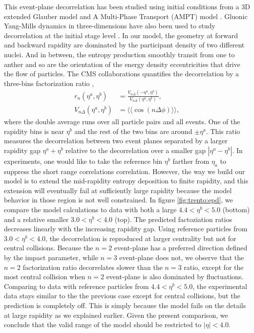 This event-plane decorrelation has been studied using initial conditions from a 3D extended Glauber model \cite{Bozek:2015bna} and A Multi-Phase Transport (AMPT) model \cite{Jia:2014ysa, Xiao:2012uw,Pang:2015zrq}.
Gluonic Yang-Mills dynamics in three-dimensions have also been used to study decorrelation at the initial stage level \cite{Schenke:2016ksl}.
In our model, the geometry at forward and backward rapidity are dominated by the participant density of two different nuclei.
And in between, the entropy production smoothly transit from one to anther and so are the orientation of the energy density eccentricities that drive the flow of particles.
The CMS collaborations quantifies the decorrelation by a three-bins factorization ratio \cite{Khachatryan:2015oea},
\begin{eqnarray}
r_n(\eta^a, \eta^b) &= \frac{V_{n\Delta}(-\eta^a, \eta^b)}{V_{n\Delta}(\eta^a, \eta^b)}, \\
V_{n\Delta}(\eta^a, \eta^b) &= \langle\langle \cos(n\Delta\phi) \rangle\rangle,
\end{eqnarray}
where the double average runs over all particle pairs and all events.
One of the rapidity bins is near $\eta^b$ and the rest of the two bins are around $\pm\eta^a$.
This ratio measures the decorrelation between two event planes separated by a larger rapidity gap $\eta^a + \eta^b$ relative to the decorrelation over a smaller gap $|\eta^a - \eta^b|$.
In experiments, one would like to take the reference bin $\eta^b$ farther from $\eta_a$ to suppress the short range correlations correlation.
However, the way we build our model is to extend the mid-rapidity entropy deposition to finite rapidity, and this extension will eventually fail at sufficiently large rapidity because the model behavior in those region is not well constrained.
In figure \ref{fig:trento:epd}, we compare the model calculations to data with both a large $4.4<\eta^b<5.0$ (bottom) and a relative smaller $3.0 < \eta^b< 4.0$ (top).
The predicted factoziation ratios decreases linearly with the increasing rapidity gap.
Using reference particles from $3.0 < \eta^b< 4.0$, the decorrelation is reproduced at larger centrality but not for central collisions.
Because the $n=2$ event-plane has a preferred direction defined by the impact parameter, while $n=3$ event-plane does not, we observe that the $n=2$ factorization ratio decorrelates slower than the $n=3$ ratio, except for the most central collision when $n=2$ event-plane is also dominated by fluctuations.
Comparing to data with reference particles from $4.4<\eta^b<5.0$, the experimental data stays similar to the the previous case except for central collisions, but the prediction is completely off.
This is simply because the model fails on the details at large rapidity as we explained earlier.
Given the present comparison, we conclude that the valid range of the model should be restricted to $|\eta| < 4.0$.

